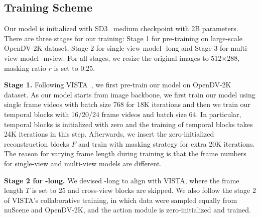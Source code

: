 \subsection{Training Scheme}
Our model is initialized with SD3~\cite{sd3} medium checkpoint with 2B parameters. 
There are three stages for our training: Stage 1 for pre-training on large-scale OpenDV-2K dataset, Stage 2 for single-view model \ourmethod-long and Stage 3 for multi-view model \ourmethod-mview. For all stages, we resize the original images to 512$\times$288, masking ratio $r$ is set to 0.25.

\noindent \textbf{Stage 1.} 
Following VISTA~\cite{vista}, we first pre-train our model on OpenDV-2K dataset. As our model starts from image backbone, we first train our model using single frame videos with batch size 768 for 18K iterations and then we train our temporal blocks with 16/20/24 frame videos and batch size 64. In particular, temporal blocks is initialized with zero and the training of temporal blocks takes 24K iterations in this step. Afterwards, we insert the zero-initialized reconstruction blocks $F$ and train with masking strategy for extra 20K iterations. The reason for varying frame length during training is that the frame numbers for single-view and multi-view models are different.

\noindent \textbf{Stage 2 for \ourmethod-long.} 
We devised \ourmethod-long to align with VISTA, where the frame length $T$ is set to 25 and cross-view blocks are skipped. We also follow the stage 2 of VISTA's collaborative training, in which data were sampled equally from nuScene and OpenDV-2K, and the action module is zero-initialized and trained.

